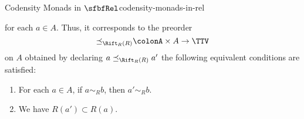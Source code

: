 \begin{example}{Codensity Monads in $\sfbfRel$}{codensity-monads-in-rel}
\begin{enumerate}
\begin{webcompile}
            \end{webcompile}
            for each $a\in A$. Thus, it corresponds to the preorder
            \[
                \mathord{\preceq_{\Rift_{R}(R)}}%
                \colon%
                A\times A%
                \to%
                \TTV%
            \]%
            on $A$ obtained by declaring $a\preceq_{\Rift_{R}(R)}a'$ \textiff the following equivalent conditions are satisfied:
            \begin{enumerate}
                \item\label{codensity-monads-in-rel-2-a}For each $a\in A$, if $a\sim_{R}b$, then $a'\sim_{R}b$.
                \item\label{codensity-monads-in-rel-2-b}We have $R(a')\subset R(a)$.
            \end{enumerate}
    \end{enumerate}
\end{example}
